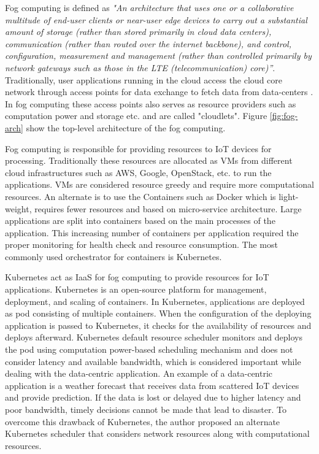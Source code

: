 Fog computing is defined as \emph{"An architecture that uses one or a collaborative multitude of end-user clients or near-user edge devices to carry out a substantial amount of storage (rather than stored primarily in cloud data centers), communication (rather than routed over the internet backbone), and control, configuration, measurement and management (rather than controlled primarily by network gateways such as those in the LTE (telecommunication) core)”}\cite{Chiang 2015; Aazam and Huh 2014}. Traditionally, user applications running in the cloud access the cloud core network through access points for data exchange to fetch data from data-centers \cite{Bittencourt2017}. In fog computing these access points also serves as resource providers such as computation power and storage etc. and are called "cloudlets"\cite{Bittencourt2017}. Figure \ref{fig:fog-arch} show the top-level architecture of the fog computing. \par
Fog computing is responsible for providing resources to IoT devices for processing. Traditionally these resources are allocated as VMs from different cloud infrastructures such as AWS, Google, OpenStack, etc. to run the applications. VMs are considered resource greedy and require more computational resources. An alternate is to use the Containers such as Docker which is light-weight, requires fewer resources and based on micro-service architecture. Large applications are split into containers based on the main processes of the application. This increasing number of containers per application required the proper monitoring for health check and resource consumption. The most commonly used orchestrator for containers is Kubernetes. \par
Kubernetes act as IaaS for fog computing to provide resources for IoT applications. Kubernetes is an open-source platform for management, deployment, and scaling of containers. In Kubernetes, applications are deployed as pod consisting of multiple containers. When the configuration of the deploying application is passed to Kubernetes, it checks for the availability of resources and deploys afterward. Kubernetes default resource scheduler monitors and deploys the pod using computation power-based scheduling mechanism and does not consider latency and available bandwidth, which is considered important while dealing with the data-centric application. An example of a data-centric application is a weather forecast that receives data from scattered IoT devices and provide prediction. If the data is lost or delayed due to higher latency and poor bandwidth, timely decisions cannot be made that lead to disaster. To overcome this drawback of Kubernetes, the author proposed an alternate Kubernetes scheduler that considers network resources along with computational resources.
